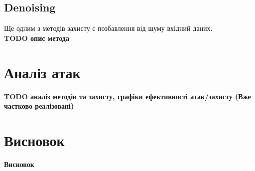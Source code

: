 \documentclass[a4paper,12pt]{extreport}
\begin{document}
	\section{Denoising}
	Ще одним з методів захисту є позбавлення від шуму вхідний даних.
	\\ \large{\textbf{TODO опис метода}} \\
	
	\chapter{Аналіз атак}
	\large{\textbf{TODO аналіз методів та захисту, графіки ефективності атак/захисту (Вже частково реалізовані)}}	\\


	\chapter{Висновок} 
	\large{\textbf{Висновок}} \\

	\nocite{goodfellow2014explaining}
	\nocite{kurakin2016adversarial}
	\nocite{moosavidezfooli2015deepfool}
	\nocite{dong2017boosting}
	\nocite{dong2019benchmarking}
	\nocite{yuan2017adversarial}
	\nocite{kurakin2018adversarial}
	
	\printbibliography[title={Бібліографія}]
\end{document}
